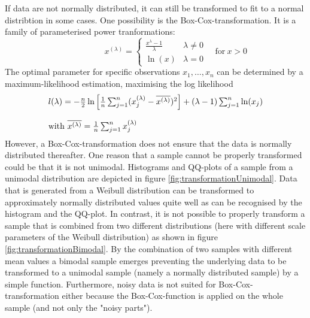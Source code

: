 \documentclass[a4paper, 12pt, titlepage, headsepline, listof = totoc, bibliography = totoc, numbers = noenddot]{scrartcl}
\begin{document}
If data are not normally distributed, it can still be transformed to fit to a normal distribtion in some cases. One possibility is the Box-Cox-transformation. It is a family of parameterised power tranformations:
\[
  \phantom{\quad\mbox{for}\ x > 0}
   x^{(\lambda)} =
   \left\{ 
    \begin{array}{cl}
                 \frac{x^\lambda - 1}{\lambda} & \lambda \neq 0\\
                 \ln(x) & \lambda = 0
    \end{array}
   \right.
   \quad\mbox{for}\ x > 0
\]
The optimal parameter for specific observations $x_1, \dots, x_n$ can be determined by a maximum-likelihood estimation, maximising the log likelihood
\[
\begin{array}{l}
\vspace{12pt}
   l(\lambda) = - \frac{n}{2}\ln\left[\frac{1}{n}\sum_{j=1}^{n}(x_j^{(\lambda)} - \overline{x^{(\lambda)}})^2\right] + (\lambda - 1) \sum_{j=1}^{n}\ln(x_j)\\
   \mbox{with}\ \overline{x^{(\lambda)}} = \frac{1}{n} \sum_{j=1}^{n}x_j^{(\lambda)}
\end{array}
\]
However, a Box-Cox-transformation does not ensure that the data is normally distributed thereafter. One reason that a sample cannot be properly transformed could be that it is not unimodal. Histograms and QQ-plots of a sample from a unimodal distribution are depicted in figure \ref{fig:transformationUnimodal}. Data that is generated from a Weibull distribution can be transformed to approximately normally distributed values quite well as can be recognised by the histogram and the QQ-plot. In contrast, it is not possible to properly transform a sample that is combined from two different distributions (here with different scale parameters of the Weibull distribution) as shown in figure \ref{fig:transformationBimodal}. By the combination of two samples with different mean values a bimodal sample emerges preventing the underlying data to be transformed to a unimodal sample (namely a normally distributed sample) by a simple function. Furthermore, noisy data is not suited for Box-Cox-transformation either because the Box-Cox-function is applied on the whole sample (and not only the "noisy parts").
\newpage
\phantom{.}
\vfill
\end{document}
